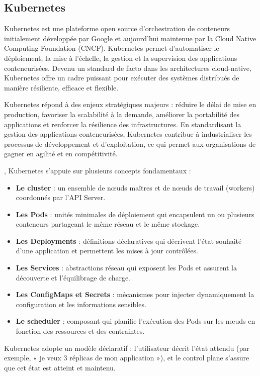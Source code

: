 \subsection{Kubernetes}

Kubernetes est une plateforme open source d’orchestration de conteneurs initialement développée par Google et aujourd’hui maintenue par la Cloud Native Computing Foundation (CNCF). Kubernetes permet d’automatiser le déploiement, la mise à l’échelle, la gestion et la supervision des applications conteneurisées. Devenu un standard de facto dans les architectures cloud-native, Kubernetes offre un cadre puissant pour exécuter des systèmes distribués de manière résiliente, efficace et flexible.

 Kubernetes répond à des enjeux stratégiques majeurs  : réduire le délai de mise en production, favoriser la scalabilité à la demande, améliorer la portabilité des applications et renforcer la résilience des infrastructures. En standardisant la gestion des applications conteneurisées, Kubernetes contribue à industrialiser les processus de développement et d’exploitation, ce qui permet aux organisations de gagner en agilité et en compétitivité.

, Kubernetes s’appuie sur plusieurs concepts fondamentaux  :
\begin{itemize}
	\item \textbf{Le cluster}  : un ensemble de nœuds maîtres et de nœuds de travail (workers) coordonnés par l’API Server.
	\item \textbf{Les Pods}  : unités minimales de déploiement qui encapsulent un ou plusieurs conteneurs partageant le même réseau et le même stockage.
	\item \textbf{Les Deployments}  : définitions déclaratives qui décrivent l’état souhaité d’une application et permettent les mises à jour contrôlées.
	\item \textbf{Les Services}  : abstractions réseau qui exposent les Pods et assurent la découverte et l’équilibrage de charge.
	\item \textbf{Les ConfigMaps et Secrets}  : mécanismes pour injecter dynamiquement la configuration et les informations sensibles.
	\item \textbf{Le scheduler}  : composant qui planifie l’exécution des Pods sur les nœuds en fonction des ressources et des contraintes.
\end{itemize}

Kubernetes adopte un modèle déclaratif  : l’utilisateur décrit l’état attendu (par exemple, «  je veux 3 réplicas de mon application  »), et le control plane s’assure que cet état est atteint et maintenu.

